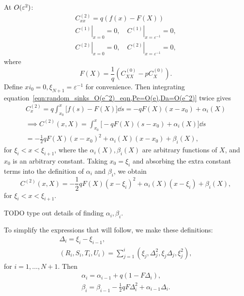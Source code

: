 At \(O(\varepsilon^2)\):
\begin{subequations}
    \label{eqn:random_sinks_O(e^2),Pe=O(e),Da=O(e^2)}
    \begin{gather}
        \label{eqn:random_sinks_O(e^2)_eqn,Pe=O(e),Da=O(e^2)}
        C^{(2)}_{xx} = q\left(f(x) - F(X)\right)\\
        \label{eqn:random_sinks_O(e^2)_bcs_C^1,Pe=O(e),Da=O(e^2)}
        \left.C^{(1)}\right|_{x=0} = 0, \quad
        \left.C^{(1)}\right|_{x=\varepsilon^{-1}} = 0,\\
        \label{eqn:random_sinks_O(e^2)_bcs_C^2,Pe=O(e),Da=O(e^2)}
        \left.C^{(2)}\right|_{x=0} = 0, \quad
        \left.C^{(2)}\right|_{x=\varepsilon^{-1}} = 0,
    \end{gather}
\end{subequations}
where
\begin{equation}
    \label{eqn:F(X)_Pe=O(e),Da=O(e^2)}
    F(X) = \frac{1}{q}\left(C^{(0)}_{XX} - pC^{(0)}_X\right).
\end{equation}
Define \(xi_0 = 0, \xi_{N+1} = \varepsilon^{-1}\) for convenience. Then
integrating equation~\eqref{eqn:random_sinks_O(e^2)_eqn,Pe=O(e),Da=O(e^2)} twice
gives
\begin{gather*}
    C^{(2)}_x = q \int_{x_0}^x \Big[f(s) - F(X)\Big] \dd s = -q F(X)(x-x_0)
    + \alpha_i(X)\\
    \implies C^{(2)}(x,X) = \int_{x_0}^x \Big[-q F(X)(s-x_0) +
    \alpha_i(X)\Big] \dd s\\
    =-\frac{1}{2} q F(X)(x-x_0)^2 + \alpha_i(X)(x-x_0) +
    \beta_i(X),
\end{gather*}
for \(\xi_i < x < \xi_{i+1}\), where the \(\alpha_i(X), \beta_i(X)\) are
arbitrary functions of \(X\), and \(x_0\) is an arbitrary constant. Taking \(x_0
= \xi_i\) and absorbing the extra constant terms into the definition of
\(\alpha_i\) and \(\beta_i\), we obtain
\begin{equation}
    \label{eqn:random_sinks_C^2_alpha_beta_i_Pe=O(e)_Da=O(e^2)}
    C^{(2)}(x,X) = -\frac{1}{2} q F(X)(x-\xi_i)^2 + \alpha_i(X)(x-\xi_i) +
    \beta_i(X),
\end{equation}
for \(\xi_i < x < \xi_{i+1}\).

TODO type out details of finding \(\alpha_i, \beta_i\).

To simplify the expressions that will follow, we make these definitions:
\begin{gather}
    \Delta_i = \xi_i - \xi_{i-1},\\
    \left(R_i,S_i,T_i,U_i\right) = \sum_{j=1}^i
    \left(\xi_j,\Delta_j^2,\xi_j\Delta_j,\xi_j^2\right),
\end{gather}
for \(i=1,\dotsc,N+1\).
Then
\begin{subequations}
    \label{eqn:alpha_beta_i_recursive}
    \begin{gather}
        \label{eqn:alpha_i_recursive}
        \alpha_i=\alpha_{i-1} + q\left(1-F\Delta_i\right),\\
        \label{eqn:beta_i_recursive}
        \beta_i=\beta_{i-1} - \frac{1}{2} q F \Delta_i^2 + \alpha_{i-1}\Delta_i.
    \end{gather}
\end{subequations}

